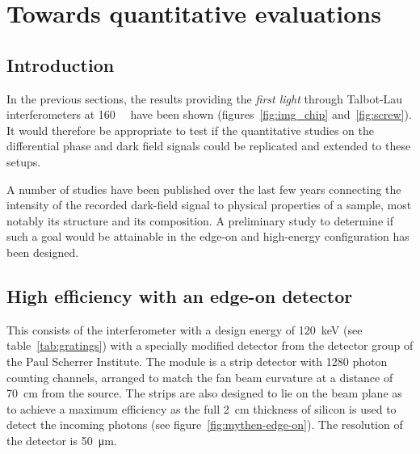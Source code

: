 \chapter{Towards quantitative evaluations}
\section{Introduction}
In the previous sections, the results providing the \emph{first light}
through Talbot-Lau interferometers at \SI{160}{\kilo\voltpeak} have been
shown (figures~\ref{fig:img_chip} and~\ref{fig:screw}). It would therefore
be appropriate to test if the quantitative studies on the differential phase
and dark field signals could be replicated and extended to these setups.

A number of studies have been published over the last few years\cn
connecting the intensity of the recorded dark-field signal to physical
properties of a sample, most notably its structure and its composition. A
preliminary study to determine if such a goal would be attainable in the
edge-on and high-energy configuration has been designed.

\section{High efficiency with an edge-on detector}
This consists of the interferometer with a design energy of
\SI{120}{\kilo\eV} (see table~\ref{tab:gratings}) with a specially modified
detector from the detector group of the Paul Scherrer Institute. The
module is a strip detector with 1280 photon counting channels, arranged to
match the fan beam curvature at a distance of \SI{70}{\centi\meter} from the
source. The strips are also designed to lie on the beam plane as to achieve
a maximum efficiency as the full \SI{2}{\centi\meter} thickness of silicon
is used to detect the incoming photons (see
figure~\ref{fig:mythen-edge-on}). The resolution of the detector is
\SI{50}{\micro\meter}.

